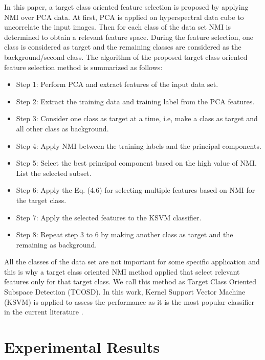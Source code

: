 \documentclass[document.tex]{subfiles}
\begin{document}
In this paper, a target class oriented feature selection is proposed by applying NMI over PCA data. At first, PCA is applied on hyperspectral data cube to uncorrelate the input images. Then for each class of the data set NMI is determined to obtain a relevant feature space. During the feature selection, one class is considered as target and the remaining classes are considered as the background/second class. The algorithm of the proposed target class oriented feature selection method is summarized as follows:
\begin{itemize}
\item Step 1: Perform PCA and extract features of the input data set.
\item Step 2: Extract the training data and training label from the
PCA features.
\item Step 3: Consider one class as target at a time, i.e, make a class as target and all other class as background. 
\item Step 4: Apply NMI between the training labels and the principal components.
\item Step 5: Select the best principal component based on the high value of NMI. List the selected subset. 
\item Step 6: Apply the Eq. (4.6) for selecting multiple features based on NMI for the target class.
\item Step 7: Apply the selected features to the KSVM classifier.
\item Step 8: Repeat step 3 to 6 by making another class as target and the remaining as background.
\end{itemize}
All the classes of the data set are not important for some specific application and this is why a target class oriented NMI method applied that select relevant features only for that target class. We call this method as Target Class Oriented Subspace Detection (TCOSD). In this work, Kernel Support Vector Machine (KSVM) is applied to assess the performance as it is the most popular classifier in the current literature \cite{11}. 

\section{Experimental Results}
\end{document}
